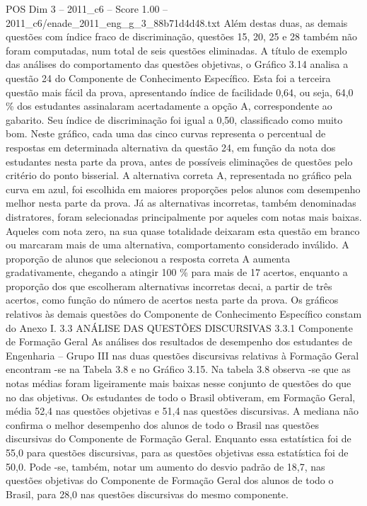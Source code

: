 \begin{textsample}{POS Dim 3 – 2011\_c6 – Score 1.00 – 2011\_c6/enade\_2011\_eng\_g\_3\_88b71d4d48.txt}
Além destas duas, as demais questões com índice fraco de discriminação, questões 15, 20, 25 e 28 também não foram computadas, num total de seis questões eliminadas.
A título de exemplo das análises do comportamento das questões objetivas, o Gráfico 3.14 analisa a questão 24 do Componente de Conhecimento Específico.
Esta foi a terceira questão mais fácil da prova, apresentando índice de facilidade 0,64, ou seja, 64,0 \% dos estudantes assinalaram acertadamente a opção A, correspondente ao gabarito.
Seu índice de discriminação foi igual a 0,50, classificado como muito bom.
Neste gráfico, cada uma das cinco curvas representa o percentual de respostas em determinada alternativa da questão 24, em função da nota dos estudantes nesta parte da prova, antes de possíveis eliminações de questões pelo critério do ponto bisserial.
A alternativa correta A, representada no gráfico pela curva em azul, foi escolhida em maiores proporções pelos alunos com desempenho melhor nesta parte da prova.
Já as alternativas incorretas, também denominadas distratores, foram selecionadas principalmente por aqueles com notas mais baixas.
Aqueles com nota zero, na sua quase totalidade deixaram esta questão em branco ou marcaram mais de uma alternativa, comportamento considerado inválido.
A proporção de alunos que selecionou a resposta correta A aumenta gradativamente, chegando a atingir 100 \% para mais de 17 acertos, enquanto a proporção dos que escolheram alternativas incorretas decai, a partir de três acertos, como função do número de acertos nesta parte da prova.
Os gráficos relativos às demais questões do Componente de Conhecimento Específico constam do Anexo I. 3.3 ANÁLISE DAS QUESTÕES DISCURSIVAS 3.3.1 Componente de Formação Geral As análises dos resultados de desempenho dos estudantes de Engenharia – Grupo III nas duas questões discursivas relativas à Formação Geral encontram -se na Tabela 3.8 e no Gráfico 3.15.
Na tabela 3.8 observa -se que as notas médias foram ligeiramente mais baixas nesse conjunto de questões do que no das objetivas.
Os estudantes de todo o Brasil obtiveram, em Formação Geral, média 52,4 nas questões objetivas e 51,4 nas questões discursivas.
A mediana não confirma o melhor desempenho dos alunos de todo o Brasil nas questões discursivas do Componente de Formação Geral.
Enquanto essa estatística foi de 55,0 para questões discursivas, para as questões objetivas essa estatística foi de 50,0.
Pode -se, também, notar um aumento do desvio padrão de 18,7, nas questões objetivas do Componente de Formação Geral dos alunos de todo o Brasil, para 28,0 nas questões discursivas do mesmo componente.

\end{textsample}
